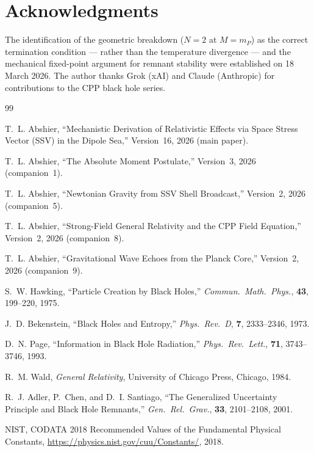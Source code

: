 \documentclass[12pt]{article}
\newcommand{\mP}{m_P}
\begin{document}
\section*{Acknowledgments}

The identification of the geometric breakdown ($N = 2$ at $M = \mP$)
as the correct termination condition — rather than the temperature
divergence — and the mechanical fixed-point argument for remnant
stability were established on 18 March 2026.  The author thanks
Grok (xAI) and Claude (Anthropic) for contributions to the CPP
black hole series.

\begin{thebibliography}{99}

T.~L. Abshier,
``Mechanistic Derivation of Relativistic Effects via Space Stress
Vector (SSV) in the Dipole Sea,''
Version~16, 2026 (main paper).

T.~L. Abshier,
``The Absolute Moment Postulate,''
Version~3, 2026 (companion~1).

T.~L. Abshier,
``Newtonian Gravity from SSV Shell Broadcast,''
Version~2, 2026 (companion~5).

T.~L. Abshier,
``Strong-Field General Relativity and the CPP Field Equation,''
Version~2, 2026 (companion~8).

T.~L. Abshier,
``Gravitational Wave Echoes from the Planck Core,''
Version~2, 2026 (companion~9).

S.~W. Hawking,
``Particle Creation by Black Holes,''
\textit{Commun.\ Math.\ Phys.}, \textbf{43}, 199--220, 1975.

J.~D. Bekenstein,
``Black Holes and Entropy,''
\textit{Phys.\ Rev.\ D}, \textbf{7}, 2333--2346, 1973.

D.~N. Page,
``Information in Black Hole Radiation,''
\textit{Phys.\ Rev.\ Lett.}, \textbf{71}, 3743--3746, 1993.

R.~M. Wald,
\textit{General Relativity},
University of Chicago Press, Chicago, 1984.

R.~J. Adler, P.~Chen, and D.~I. Santiago,
``The Generalized Uncertainty Principle and Black Hole Remnants,''
\textit{Gen.\ Rel.\ Grav.}, \textbf{33}, 2101--2108, 2001.

NIST, CODATA 2018 Recommended Values of the Fundamental Physical
Constants, \url{https://physics.nist.gov/cuu/Constants/}, 2018.

\end{thebibliography}
\end{document}
